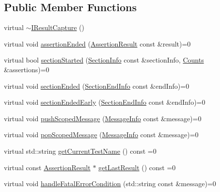 \subsection*{Public Member Functions}
\begin{DoxyCompactItemize}
\item 
virtual \hyperlink{struct_catch_1_1_i_result_capture_a3bd16719d6772b7470887fc36c6d0808}{$\sim$\-I\-Result\-Capture} ()
\item 
virtual void \hyperlink{struct_catch_1_1_i_result_capture_ae45e08bccc5fb434656d4f2e44742223}{assertion\-Ended} (\hyperlink{class_catch_1_1_assertion_result}{Assertion\-Result} const \&result)=0
\item 
virtual bool \hyperlink{struct_catch_1_1_i_result_capture_a5b76ed52badcb64cf374202e12b81a03}{section\-Started} (\hyperlink{struct_catch_1_1_section_info}{Section\-Info} const \&section\-Info, \hyperlink{struct_catch_1_1_counts}{Counts} \&assertions)=0
\item 
virtual void \hyperlink{struct_catch_1_1_i_result_capture_a4e152bc43dc0933684e31fa67a58195d}{section\-Ended} (\hyperlink{struct_catch_1_1_section_end_info}{Section\-End\-Info} const \&end\-Info)=0
\item 
virtual void \hyperlink{struct_catch_1_1_i_result_capture_afcc71eef8ca821ae132cced4a2be6988}{section\-Ended\-Early} (\hyperlink{struct_catch_1_1_section_end_info}{Section\-End\-Info} const \&end\-Info)=0
\item 
virtual void \hyperlink{struct_catch_1_1_i_result_capture_a91d154c1e087e383dcde5aad95cb6a05}{push\-Scoped\-Message} (\hyperlink{struct_catch_1_1_message_info}{Message\-Info} const \&message)=0
\item 
virtual void \hyperlink{struct_catch_1_1_i_result_capture_a42bcb13276706bf8c3ce081ce16d37fd}{pop\-Scoped\-Message} (\hyperlink{struct_catch_1_1_message_info}{Message\-Info} const \&message)=0
\item 
virtual std\-::string \hyperlink{struct_catch_1_1_i_result_capture_aea1617f4a84cc648246aa3ed6918b5bf}{get\-Current\-Test\-Name} () const =0
\item 
virtual const \hyperlink{class_catch_1_1_assertion_result}{Assertion\-Result} $\ast$ \hyperlink{struct_catch_1_1_i_result_capture_ab18872c89fab97405a56e9c6a4919736}{get\-Last\-Result} () const =0
\item 
virtual void \hyperlink{struct_catch_1_1_i_result_capture_a7d995222301e6605f26549726b30c3ee}{handle\-Fatal\-Error\-Condition} (std\-::string const \&message)=0
\end{DoxyCompactItemize}


